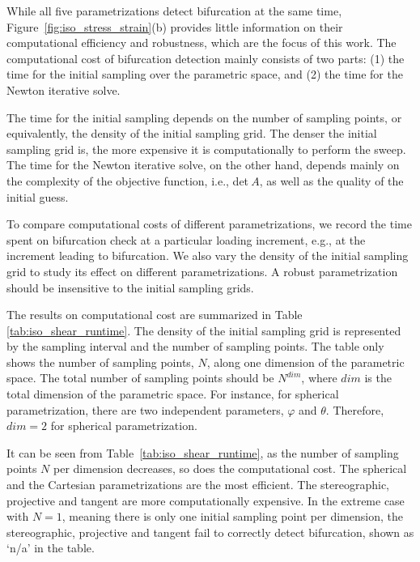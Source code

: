 \documentclass[12pt]{article}
\numberwithin{equation}{section}
\begin{document}
While all five parametrizations detect bifurcation at the same time,
Figure~\ref{fig:iso_stress_strain}(b) provides little information on
their computational efficiency and robustness, which are the focus of
this work. The computational cost of bifurcation detection mainly
consists of two parts: (1) the time for the initial sampling over the
parametric space, and (2) the time for the Newton iterative solve.

The time for the initial sampling depends on the number of sampling
points, or equivalently, the density of the initial sampling grid. The
denser the initial sampling grid is, the more expensive it is
computationally to perform the sweep. The time for the Newton
iterative solve, on the other hand, depends mainly on the complexity
of the objective function, i.e., det$~A$, as well as the quality of
the initial guess.

To compare computational costs of different parametrizations, we
record the time spent on bifurcation check at a particular loading
increment, e.g., at the increment leading to bifurcation. We also vary
the density of the initial sampling grid to study its effect on
different parametrizations. A robust parametrization should be
insensitive to the initial sampling grids.

The results on computational cost are summarized in Table~
\ref{tab:iso_shear_runtime}. The density of the initial sampling grid
is represented by the sampling interval and the number of sampling
points. The table only shows the number of sampling points, $N$, along
one dimension of the parametric space. The total number of sampling
points should be $N^{dim}$, where $dim$ is the total dimension of
the parametric space. For instance, for spherical parametrization,
there are two independent parameters, $\varphi$ and $\theta$.
Therefore, $dim=2$ for spherical parametrization.

It can be seen from Table~\ref{tab:iso_shear_runtime}, as the number
of sampling points $N$ per dimension decreases, so does the
computational cost. The spherical and the Cartesian parametrizations
are the most efficient. The stereographic, projective and tangent are
more computationally expensive. In the extreme case with $N=1$,
meaning there is only one initial sampling point per dimension, the
stereographic, projective and tangent fail to correctly detect
bifurcation, shown as `n/a' in the table.
\end{document}
